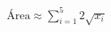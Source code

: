 \documentclass[preview]{standalone}
\begin{document}
\begin{align*}
\text{Área} \approx \sum_{i=1}^{5} 2 \sqrt{x_i}
\end{align*}
\end{document}
